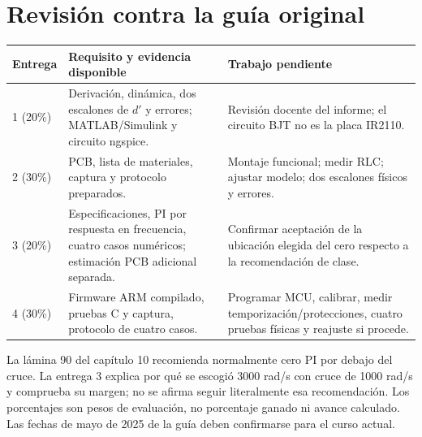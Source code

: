 \documentclass[11pt,a4paper]{article}
\begin{document}
\newpage
\section*{Revisión contra la guía original}
\begin{tabularx}{\linewidth}{lXX}
\toprule Entrega & Requisito y evidencia disponible & Trabajo pendiente \\\midrule
1 (20\%) & Derivación, dinámica, dos escalones de $d'$ y errores; MATLAB/Simulink y circuito ngspice. & Revisión docente del informe; el circuito BJT no es la placa IR2110.\\
2 (30\%) & PCB, lista de materiales, captura y protocolo preparados. & Montaje funcional; medir RLC; ajustar modelo; dos escalones físicos y errores.\\
3 (20\%) & Especificaciones, PI por respuesta en frecuencia, cuatro casos numéricos; estimación PCB adicional separada. & Confirmar aceptación de la ubicación elegida del cero respecto a la recomendación de clase.\\
4 (30\%) & Firmware ARM compilado, pruebas C y captura, protocolo de cuatro casos. & Programar MCU, calibrar, medir temporización/protecciones, cuatro pruebas físicas y reajuste si procede.\\\bottomrule
\end{tabularx}\par
La lámina 90 del capítulo 10 recomienda normalmente cero PI por debajo del cruce. La entrega 3 explica por qué se escogió 3000 rad/s con cruce de 1000 rad/s y comprueba su margen; no se afirma seguir literalmente esa recomendación. Los porcentajes son pesos de evaluación, no porcentaje ganado ni avance calculado. Las fechas de mayo de 2025 de la guía deben confirmarse para el curso actual.
\end{document}
